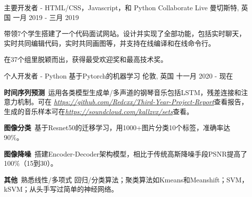 \begin{cventries}
  \cventry
  {主要开发者 - HTML/CSS，Javascript，和 Python} %
  {Collaborate Live} %
  {曼切斯特, 英国} %
  {一月 2019 - 三月 2019} %
  {
    \begin{cvitems} %
      \item {带领7个学生搭建了一个代码面试网站。设计并实现了全部功能，包括实时聊天，实时共同编辑代码，实时共同画图等，并支持在线编译和在线命令行。}
      \item {在37个组里脱颖而出，获得最受欢迎奖和最高技术奖。}
    \end{cvitems}
  }
    
  \cventry
    {个人开发者 - Python} %
    {基于Pytorch的机器学习} %
    {伦敦, 英国} %
    {十一月 2020 - 现在} %
    {
      \begin{cvitems} %
      \item {\textbf{时间序列预测}\, 运用各类模型生成单/多声道的钢琴音乐包括LSTM，残差连接和注意力机制。可在 \href{https://github.com/Redcxx/Third-Year-Project-Report}{\textit{https://github.com/Redcxx/Third-Year-Project-Report}}查看报告，生成的音乐样本可在\href{https://soundcloud.com/kallzvx/sets}{\textit{https://soundcloud.com/kallzvx/sets}}查看。}
      \item {\textbf{图像分类}\, 基于Resnet50的迁移学习，用1000+图片分类10个标签，准确率达90\%。}
      \item {\textbf{图像降噪}\, 搭建Encoder-Decoder架构模型，相比于传统高斯降噪手段PSNR提高了100\%（15到30）。}
      \item {\textbf{其他}\, 熟悉线性/多项式 回归/分类算法；聚类算法如Kmeans和Meanshift；SVM，kSVM；从头手写过简单的神经网络。}
      \end{cvitems}
    }
    
  


\end{cventries}
